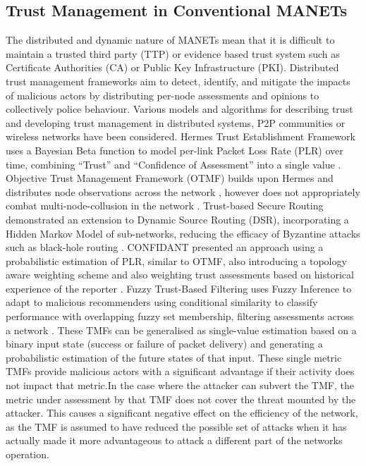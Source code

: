 \subsection{Trust Management in Conventional MANETs}
The distributed and dynamic nature of MANETs mean that it is difficult to maintain a trusted third party (TTP) or evidence based trust system such as Certificate Authorities (CA) or Public Key Infrastructure (PKI). Distributed trust management frameworks aim to detect, identify, and mitigate the impacts of malicious actors by distributing per-node assessments and opinions to collectively police behaviour. Various models and algorithms for describing trust and developing trust management in distributed systems, P2P communities or wireless networks have been considered.
Hermes Trust Establishment Framework uses a Bayesian Beta function to model per-link Packet Loss Rate (PLR) over time, combining ``Trust'' and ``Confidence of Assessment'' into a single value \cite{Zouridaki2005}. Objective Trust Management Framework (OTMF) builds upon Hermes and distributes node observations across the network \cite{Li2008}, however does not appropriately combat multi-node-collusion in the network \cite{Cho2011}. Trust-based Secure Routing demonstrated an extension to Dynamic Source Routing (DSR), incorporating a Hidden Markov Model of sub-networks, reducing the efficacy of Byzantine attacks such as black-hole routing  \cite{Moe2008a}. CONFIDANT presented an approach using a probabilistic estimation of PLR, similar to OTMF, also introducing a topology aware weighting scheme and also weighting trust assessments based on historical experience of the reporter \cite{Buchegger2002}. Fuzzy Trust-Based Filtering uses Fuzzy Inference to adapt to malicious recommenders using conditional similarity to classify performance with overlapping fuzzy set membership, filtering assessments across a network \cite{Luo2008}. 
These TMFs can be generalised as single-value estimation based on a binary input state (success or failure of packet delivery) and generating a probabilistic estimation of the future states of that input. These single metric TMFs provide malicious actors with a significant advantage if their activity does not impact that metric.In the case where the attacker can subvert the TMF, the metric under assessment by that TMF does not cover the threat mounted by the attacker. This causes a significant negative effect on the efficiency of the network, as the TMF is assumed to have reduced the possible set of attacks when it has actually made it more advantageous to attack a different part of the networks operation.
